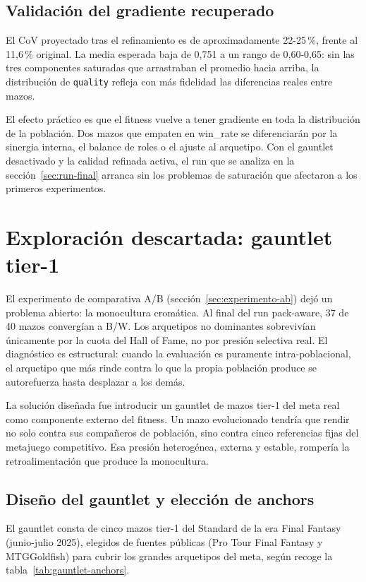 \subsection{Validación del gradiente recuperado}

El CoV proyectado tras el refinamiento es de aproximadamente 22-25\,\%, frente al 11,6\,\% original. La media esperada baja de 0,751 a un rango de 0,60-0,65: sin las tres componentes saturadas que arrastraban el promedio hacia arriba, la distribución de \texttt{quality} refleja con más fidelidad las diferencias reales entre mazos.

El efecto práctico es que el fitness vuelve a tener gradiente en toda la distribución de la población. Dos mazos que empaten en win\_rate se diferenciarán por la sinergia interna, el balance de roles o el ajuste al arquetipo. Con el gauntlet desactivado y la calidad refinada activa, el run que se analiza en la sección~\ref{sec:run-final} arranca sin los problemas de saturación que afectaron a los primeros experimentos.

\section{Exploración descartada: gauntlet tier-1}
\label{sec:gauntlet}

El experimento de comparativa A/B (sección~\ref{sec:experimento-ab}) dejó un problema abierto: la monocultura cromática. Al final del run pack-aware, 37 de 40 mazos convergían a B/W. Los arquetipos no dominantes sobrevivían únicamente por la cuota del Hall of Fame, no por presión selectiva real. El diagnóstico es estructural: cuando la evaluación es puramente intra-poblacional, el arquetipo que más rinde contra lo que la propia población produce se autorefuerza hasta desplazar a los demás.

La solución diseñada fue introducir un gauntlet de mazos tier-1 del meta real como componente externo del fitness. Un mazo evolucionado tendría que rendir no solo contra sus compañeros de población, sino contra cinco referencias fijas del metajuego competitivo. Esa presión heterogénea, externa y estable, rompería la retroalimentación que produce la monocultura.

\subsection{Diseño del gauntlet y elección de anchors}

El gauntlet consta de cinco mazos tier-1 del Standard de la era Final Fantasy (junio-julio 2025), elegidos de fuentes públicas (Pro Tour Final Fantasy y MTGGoldfish) para cubrir los grandes arquetipos del meta, según recoge la tabla~\ref{tab:gauntlet-anchors}.

